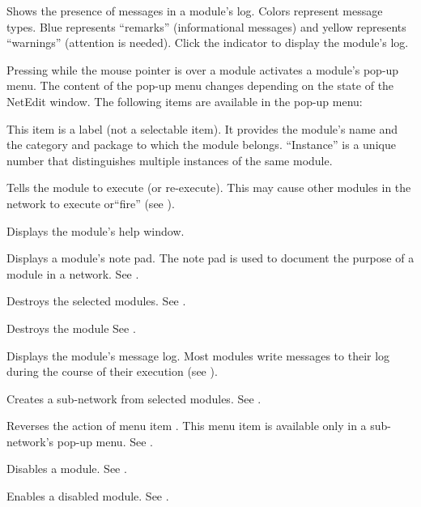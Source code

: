\begin{description}
   Shows the presence of messages in a
  module's log.  Colors represent message types.  Blue represents
  ``remarks'' (informational messages) and yellow represents ``warnings''
  (attention is needed).  Click the indicator to display the
  module's log.
  
   Pressing  while the mouse pointer is
  over a module activates a module's pop-up menu.  The content
  of the pop-up menu changes depending on the state of the NetEdit
  window. The following items are available in the pop-up menu:

  \begin{description}
     This item is a
    label (not a selectable item).  It provides the module's name and
    the category and package to which the module belongs.
    ``Instance'' is a unique number that distinguishes multiple
    instances of the same module.
    
     Tells the module to execute (or
    re-execute).  This may cause other modules in the network to
    execute or``fire'' (see ).

     Displays the module's help window.
    
     Displays a module's note pad.  The note pad
    is used to document the purpose of a module in a network.  See
    .

     Destroys the selected modules.
    See .
    
     Destroys the module See .
    
     Displays the module's message log.  Most
    modules write messages to their log during the course of
    their execution (see ).
    
     Creates a sub-network from
    selected modules.  See .
    
     Reverses the action of menu item
    .  This menu item is available only in
    a sub-network's pop-up menu.  See .
    
     Disables a module.  See
    .
    
     Enables a disabled module.  See
    .

  \end{description}
\end{description}


